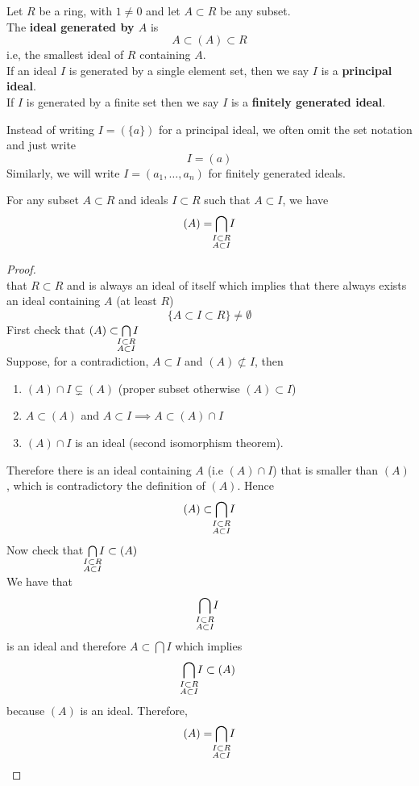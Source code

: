 \documentclass[../Main.tex]{subfiles}
\begin{document}
\begin{dfn}[title = {Ideal Generation, Principal and Finitely Generated Ideal}]
	Let $R$ be a ring, with $1\ne 0$ and let $A\subset R$ be any subset.\\
	The \textbf{ideal generated by $A$} is
	\[A\subset (A)\subset R\]
	i.e, the smallest ideal of $R$ containing $A$.\\
	If an ideal $I$ is generated by a single element set, then we say $I$ is a \textbf{principal ideal}.\\
	If $I$ is generated by a finite set then we say $I$ is a \textbf{finitely generated ideal}.
\end{dfn}
\Note Instead of writing $I=(\{a\})$ for a principal ideal, we often omit the set notation and just write
\[I=(a)\]
Similarly, we will write $I=(a_1,\dots, a_n)$ for finitely generated ideals. 
\begin{prop}[title = Minimality of ideal generated by a set]
	For any subset $A \subset R$ and ideals $I\subset R$ such that $A\subset I$, we have
	\[(A)= \bigcap_{\mathclap{\substack{I \subset R\\A\subset I} } } I\]
\end{prop}
\begin{proof}~\\
	\Obs that $R\subset R$ and is always an ideal of itself which implies that there always exists an ideal containing $A$ (at least $R$)
	\[\{A\subset I\subset R\} \ne \emptyset\]
	First check that $(A)\subset \bigcap\limits_{\mathclap{\substack{I \subset R \\A\subset I} } } I$\\
	Suppose, for a contradiction, $A\subset I$ and $(A) \not\subset I$, then
	\begin{enumerate}
		\item $(A) \cap I \subsetneq (A)$ (proper subset otherwise $(A)\subset I$)
		\item $A\subset (A)$ and $A\subset I \implies A\subset (A)\cap I$
		\item $(A) \cap I$ is an ideal (second isomorphism theorem).
	\end{enumerate}
	Therefore there is an ideal containing $A$ (i.e $(A) \cap I$) that is smaller than $(A)$, which is contradictory the definition of $(A)$. Hence\[(A)\subset \bigcap\limits_{\mathclap{\substack{I \subset R \\A\subset I} } } I\] 
	Now check that $\bigcap\limits_{\mathclap{\substack{I \subset R \\A\subset I} } } I\subset (A) $\\
	We have that
	\[\bigcap_{\mathclap{\substack{I \subset R\\A\subset I} } } I\] is an ideal and therefore $A\subset \bigcap I$ which implies
	\[\bigcap_{\mathclap{\substack{I \subset R \\A\subset I} } } I\subset (A) \]
	because $(A)$ is an ideal.
	Therefore,
		\[(A)= \bigcap_{\mathclap{\substack{I \subset R\\A\subset I} } } I\qedhere\]
\end{proof}
\end{document}
